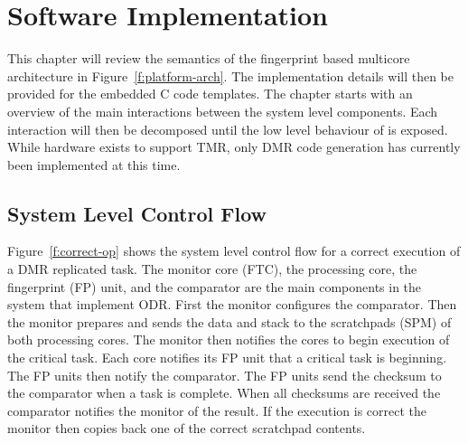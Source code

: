 
\chapter{Software Implementation} %

\label{c:soft-impl} %

	This chapter will review the semantics of the fingerprint based multicore architecture in Figure~\ref{f:platform-arch}. 
	The implementation details will then be provided for the embedded C code templates. 
	The chapter starts with an overview of the main interactions between the system level components. 
	Each interaction will then be decomposed until the low level behaviour of is exposed. While hardware exists to support TMR, only DMR code generation has currently been implemented at this time. 

	
\section{System Level Control Flow}
		
	Figure~\ref{f:correct-op} shows the system level control flow for a correct execution of a DMR replicated task.
	The monitor core (FTC), the processing core, the fingerprint (FP) unit, and the comparator are the main components in the system that implement ODR. 
	First the monitor configures the comparator. 
	Then the monitor prepares and sends the data and stack to the scratchpads (SPM) of both processing cores. 
	The monitor then notifies the cores to begin execution of the critical task. 
	Each core notifies its FP unit that a critical task is beginning. 
	The FP units then notify the comparator. 
	The FP units send the checksum to the comparator when a task is complete. 
	When all checksums are received the comparator notifies the monitor of the result. 
	If the execution is correct the monitor then copies back one of the correct scratchpad contents. 




